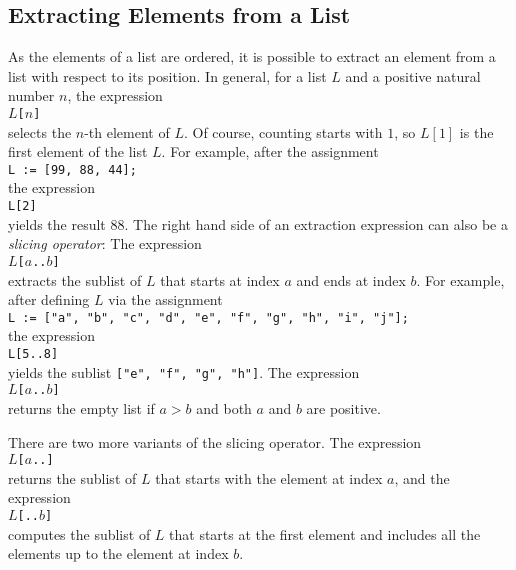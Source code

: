 \subsection{Extracting Elements from a List}
As the elements of a list are ordered, it is possible to extract an element from a list with respect
to its position.  In general, for a list $L$ and a positive natural number $n$, the expression
\\[0.2cm]
\hspace*{1.3cm}
\texttt{$L$[$n$]}
\\[0.2cm]
selects the $n$-th element of $L$.  Of course, counting starts with $1$, so $L[1]$ is the first element
of the list $L$.  For example, after the assignment
\\[0.2cm]
\hspace*{1.3cm}
\texttt{L := [99, 88, 44];}
\\[0.2cm]
the expression 
\\[0.2cm]
\hspace*{1.3cm}
\texttt{L[2]}
\\[0.2cm]
yields the result $88$.  The right hand side of an extraction expression can also be a \emph{slicing operator}:
The expression
\\[0.2cm]
\hspace*{1.3cm}
\texttt{$L$[$a$..$b$]}
\\[0.2cm]
extracts the sublist of $L$ that starts at index $a$ and ends at index $b$.  For example,
after defining $L$ via the assignment
\\[0.2cm]
\hspace*{1.3cm}
\texttt{L := ["a", "b", "c", "d", "e", "f", "g", "h", "i", "j"];}
\\[0.2cm]
the expression
\\[0.2cm]
\hspace*{1.3cm}
\texttt{L[5..8]}
\\[0.2cm]
yields the sublist \texttt{["e", "f", "g", "h"]}.  The  expression 
\\[0.2cm]
\hspace*{1.3cm}
\texttt{$L$[$a$..$b$]}
\\[0.2cm]
returns the empty list if $a > b$ and both $a$ and $b$ are positive.  

There are two more variants of the slicing operator.   The expression
\\[0.2cm]
\hspace*{1.3cm}
\texttt{$L$[$a$..]}
\\[0.2cm]
returns the sublist of $L$ that starts with the element at index $a$, and the expression
\\[0.2cm]
\hspace*{1.3cm}
\texttt{$L$[..$b$]}
\\[0.2cm]
computes the sublist of $L$ that starts at the first element and includes all the elements up to the
element at index $b$.

